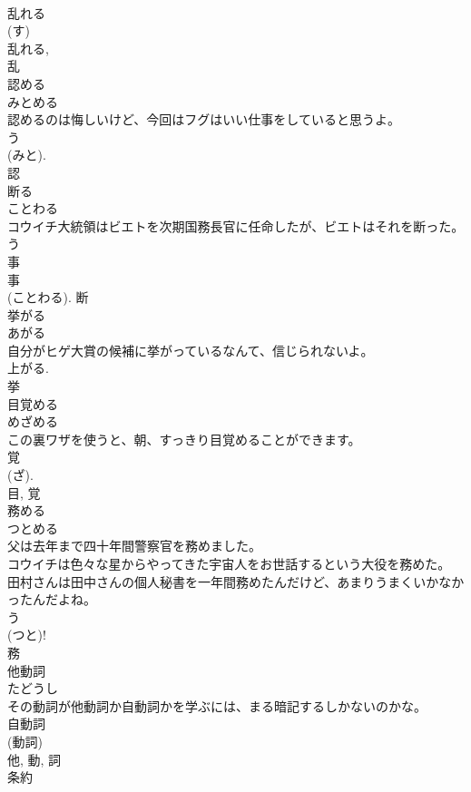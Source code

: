 \documentclass[8pt]{extreport}
\begin{document}
\begin{CJK}{UTF8}{min}
\\	乱れる 
\\	(す) 
\\	乱れる, 
\\	乱	
\\	認める	
\\	みとめる	
\\	認めるのは悔しいけど、今回はフグはいい仕事をしていると思うよ。	
\\	う 
\\	(みと). 
\\	認	
\\	断る	
\\	ことわる	
\\	コウイチ大統領はビエトを次期国務長官に任命したが、ビエトはそれを断った。	
\\	う 
\\	事 
\\	事 
\\	(ことわる).	断	
\\	挙がる	
\\	あがる	
\\	自分がヒゲ大賞の候補に挙がっているなんて、信じられないよ。	
\\	上がる. 
\\	挙	
\\	目覚める	
\\	めざめる	
\\	この裏ワザを使うと、朝、すっきり目覚めることができます。	
\\	覚 
\\	(ざ). 
\\	目, 覚	
\\	務める	
\\	つとめる	
\\	父は去年まで四十年間警察官を務めました。	
\\	コウイチは色々な星からやってきた宇宙人をお世話するという大役を務めた。	
\\	田村さんは田中さんの個人秘書を一年間務めたんだけど、あまりうまくいかなかったんだよね。	
\\	う 
\\	(つと)! 
\\	務	
\\	他動詞	
\\	たどうし	
\\	その動詞が他動詞か自動詞かを学ぶには、まる暗記するしかないのかな。	
\\	自動詞 
\\	(動詞) 
\\	他, 動, 詞	
\\	条約	

\end{CJK}
\end{document}
